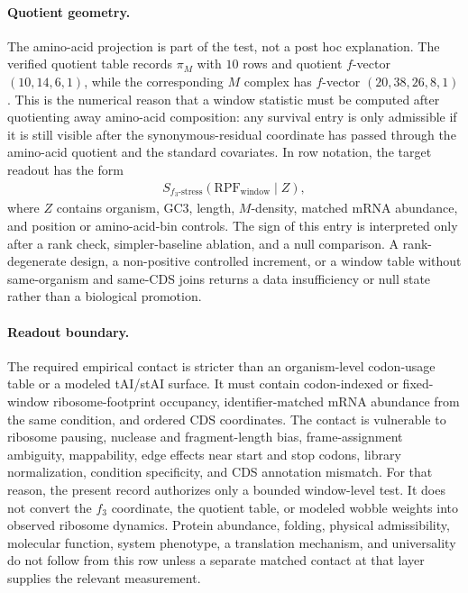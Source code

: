 \paragraph{Quotient geometry.}
The amino-acid projection is part of the test, not a post hoc explanation. The verified quotient table records $\pi_M$ with $10$ rows and quotient $f$-vector $(10,14,6,1)$, while the corresponding $M$ complex has $f$-vector $(20,38,26,8,1)$. This is the numerical reason that a window statistic must be computed after quotienting away amino-acid composition: any survival entry is only admissible if it is still visible after the synonymous-residual coordinate has passed through the amino-acid quotient and the standard covariates. In row notation, the target readout has the form
$$
\begin{aligned}
S_{f_3\text{-stress}}(\mathrm{RPF}_{\mathrm{window}}\mid Z),
\end{aligned}
$$
where $Z$ contains organism, GC3, length, $M$-density, matched mRNA abundance, and position or amino-acid-bin controls. The sign of this entry is interpreted only after a rank check, simpler-baseline ablation, and a null comparison. A rank-degenerate design, a non-positive controlled increment, or a window table without same-organism and same-CDS joins returns a data insufficiency or null state rather than a biological promotion.

\paragraph{Readout boundary.}
The required empirical contact is stricter than an organism-level codon-usage table or a modeled tAI/stAI surface. It must contain codon-indexed or fixed-window ribosome-footprint occupancy, identifier-matched mRNA abundance from the same condition, and ordered CDS coordinates. The contact is vulnerable to ribosome pausing, nuclease and fragment-length bias, frame-assignment ambiguity, mappability, edge effects near start and stop codons, library normalization, condition specificity, and CDS annotation mismatch. For that reason, the present record authorizes only a bounded window-level test. It does not convert the $f_3$ coordinate, the quotient table, or modeled wobble weights into observed ribosome dynamics. Protein abundance, folding, physical admissibility, molecular function, system phenotype, a translation mechanism, and universality do not follow from this row unless a separate matched contact at that layer supplies the relevant measurement.

